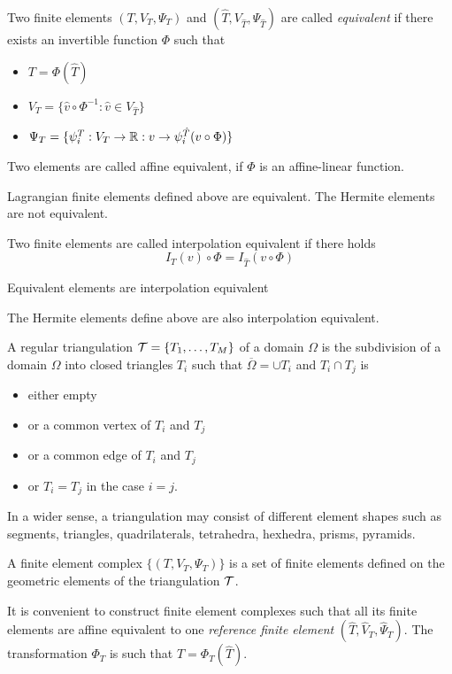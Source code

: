 Two finite elements $(T,V_T, \Psi_T)$ and 
$(\widehat T, V_{\widehat T}, \Psi_{\widehat T})$ are called 
{\em equivalent} if there exists an invertible function $\Phi$ such that
\begin{itemize}
\item $T = \Phi (\widehat T)$
\item $V_T = \{ \hat v \circ \Phi^{-1} : \hat v \in V_{\widehat T} \}$
\item $\Psi_T = \{ \psi^T_i : V_T \rightarrow {\mathbb R} : v \rightarrow \psi^{\hat T}_i (v \circ \Phi) \}$
\end{itemize}
Two elements are called affine equivalent, if $\Phi$ is an affine-linear function.

Lagrangian finite elements defined above are equivalent. The Hermite elements are not equivalent.

Two finite elements are called interpolation equivalent if there holds
$$
I_T (v) \circ \Phi = I_{\widehat T} (v \circ \Phi)
$$

\begin{lemma} Equivalent elements are interpolation equivalent
\end{lemma}

The Hermite elements define above are also interpolation equivalent.

A regular triangulation ${\cal T} = \{ T_1, \ldots, T_M \}$ of a domain 
$\Omega$ is the subdivision of a domain $\Omega$ into closed triangles $T_i$
such that $\overline \Omega = \cup T_i$ and $T_i \cap T_j$ is 
\begin{itemize}
\item either empty
\item or a common vertex of $T_i$ and $T_j$
\item or a common edge of $T_i$ and $T_j$
\item or $T_i = T_j$ in the case $i = j$.
\end{itemize}
%
In a wider sense, a triangulation may consist of different element shapes such
as segments, triangles,  quadrilaterals, tetrahedra, hexhedra, prisms, pyramids.


A finite element complex $\{ (T, V_T, \Psi_T) \}$ is a set of finite elements
defined on the geometric elements of the triangulation ${\cal T}$.

It is convenient to construct finite element complexes such that all
its finite elements are affine equivalent to one {\em reference finite element} $(\widehat T, \hat V_T, \hat \Psi_T)$. The transformation $\Phi_T$ is such that
$T = \Phi_T (\widehat T)$.


